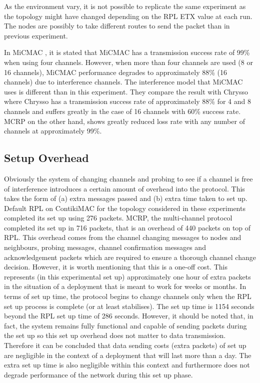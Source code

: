 
As the environment vary, it is not possible to replicate the same experiment as the topology might have changed depending on the RPL ETX value at each run. The nodes are possibly to take different routes to send the packet than in previous experiment.

In MiCMAC \cite{micmac}, it is stated that MiCMAC has a transmission success rate of 99\% when using four channels. However, when more than four channels are used (8 or 16 channels), MiCMAC performance degrades to approximately 88\% (16 channels) due to interference channels. The interference model that MiCMAC uses is different than in this experiment. They compare the result with Chrysso where Chrysso has a transmission success rate of approximately 88\% for 4 and 8 channels and suffers greatly in the case of 16 channels with 60\% success rate.
MCRP on the other hand, shows greatly reduced loss rate with any number of channels at approximately 99\%.

\subsection{Setup Overhead}
Obviously the system of changing channels and probing to see if a channel is free of interference introduces a certain amount of overhead into
the protocol. This takes the form of (a) extra messages passed and (b) extra time taken to set up. Default RPL on ContikiMAC for the topology considered in these experiments completed its set up using 276 packets. MCRP, the multi-channel protocol completed its set up in 716 packets, that is an overhead of 440 packets on top of RPL. 
This overhead comes from the channel changing messages to nodes and neighbours, probing messages, channel confirmation messages and acknowledgement packets which are required to ensure a thorough channel change decision.
However, it is worth mentioning that this is a one-off cost. This represents (in this experimental set up) approximately one hour of extra packets in the situation of a deployment that is meant to work for weeks or months.  In terms of set up time, the protocol begins to change channels only when the RPL set up process is complete (or at least stabilises). The set up time is 1154 seconds beyond the RPL set up time of 286 seconds. However, it should be noted that, in fact, the system remains fully functional and capable of sending packets during the set up so this set up overhead does not matter to data transmission.
Therefore it can be concluded that data sending costs (extra packets) of set up are negligible in the context of a deployment that will last more than a day. The extra set up time is also negligible within this context and furthermore does not degrade performance of the network during this set up phase.